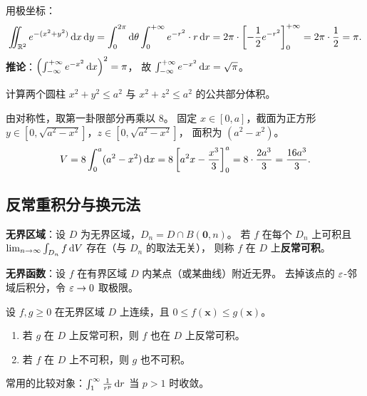 \documentclass{ctexart}
\begin{document}
\begin{solution}
  用极坐标：
  \[
    \iint_{\mathbb{R}^2} e^{-(x^2+y^2)} \,\mathrm{d} x\,\mathrm{d} y
    = \int_0^{2\pi} \mathrm{d} \theta \int_0^{+\infty} e^{-r^2} \cdot r \,\mathrm{d} r
    = 2\pi \cdot \left[ -\frac{1}{2} e^{-r^2} \right]_0^{+\infty}
    = 2\pi \cdot \frac{1}{2}
    = \pi.
  \]
  \textbf{推论}：$\left( \int_{-\infty}^{+\infty} e^{-x^2} \,\mathrm{d} x \right)^2 = \pi$，
  故 $\int_{-\infty}^{+\infty} e^{-x^2} \,\mathrm{d} x = \sqrt{\pi}$。
\end{solution}

\begin{exercise}
  计算两个圆柱 $x^2+y^2 \le a^2$ 与 $x^2+z^2 \le a^2$ 的公共部分体积。
\end{exercise}

\begin{solution}
  由对称性，取第一卦限部分再乘以 $8$。
  固定 $x \in [0,a]$，截面为正方形
  $y \in [0, \sqrt{a^2-x^2}]$，$z \in [0, \sqrt{a^2-x^2}]$，
  面积为 $(a^2-x^2)$。
  \[
    V = 8 \int_0^a (a^2 - x^2) \,\mathrm{d} x
    = 8 \left[ a^2 x - \frac{x^3}{3} \right]_0^a
    = 8 \cdot \frac{2a^3}{3}
    = \frac{16a^3}{3}.
  \]
\end{solution}

\subsection{反常重积分与换元法}

\begin{definition}[反常重积分]
  \textbf{无界区域}：设 $D$ 为无界区域，$D_n = D \cap B(\mathbf{0}, n)$。
  若 $f$ 在每个 $D_n$ 上可积且
  $\lim_{n \to \infty} \int_{D_n} f \,\mathrm{d} V$ 存在（与 $D_n$ 的取法无关），
  则称 $f$ 在 $D$ 上\textbf{反常可积}。

  \textbf{无界函数}：设 $f$ 在有界区域 $D$ 内某点（或某曲线）附近无界。
  去掉该点的 $\varepsilon$-邻域后积分，令 $\varepsilon \to 0$ 取极限。
\end{definition}

\begin{theorem}[反常重积分的比较判别法]
  设 $f, g \ge 0$ 在无界区域 $D$ 上连续，且 $0 \le f(\mathbf{x}) \le g(\mathbf{x})$。
  \begin{enumerate}
    \item 若 $g$ 在 $D$ 上反常可积，则 $f$ 也在 $D$ 上反常可积。
    \item 若 $f$ 在 $D$ 上不可积，则 $g$ 也不可积。
  \end{enumerate}
  常用的比较对象：$\int_1^\infty \frac{1}{r^p} \,\mathrm{d} r$ 当 $p > 1$ 时收敛。
\end{theorem}
\end{document}
